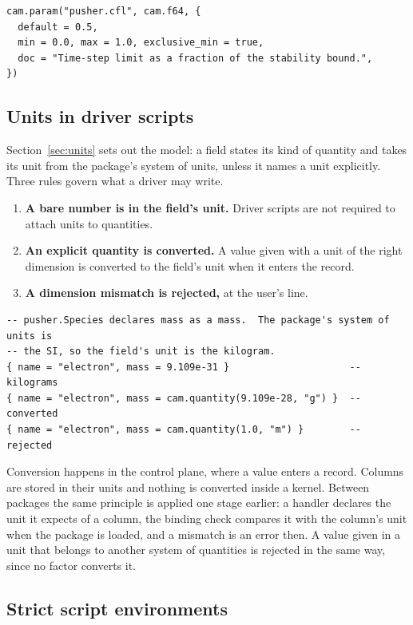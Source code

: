 \documentclass[11pt,a4paper]{article}
\begin{document}
\begin{lstlisting}[language={[5.3]Lua}]
cam.param("pusher.cfl", cam.f64, {
  default = 0.5,
  min = 0.0, max = 1.0, exclusive_min = true,
  doc = "Time-step limit as a fraction of the stability bound.",
})
\end{lstlisting}

\subsection{Units in driver scripts}

Section~\ref{sec:units} sets out the model: a field states its kind of
quantity and takes its unit from the package's system of units, unless it
names a unit explicitly.  Three rules govern what a driver may write.

\begin{enumerate}
  \item \textbf{A bare number is in the field's unit.}  Driver scripts are
        not required to attach units to quantities.
  \item \textbf{An explicit quantity is converted.}  A value given with a
        unit of the right dimension is converted to the field's unit when
        it enters the record.
  \item \textbf{A dimension mismatch is rejected,} at the user's line.
\end{enumerate}

\begin{lstlisting}[language={[5.3]Lua}]
-- pusher.Species declares mass as a mass.  The package's system of units is
-- the SI, so the field's unit is the kilogram.
{ name = "electron", mass = 9.109e-31 }                     -- kilograms
{ name = "electron", mass = cam.quantity(9.109e-28, "g") }  -- converted
{ name = "electron", mass = cam.quantity(1.0, "m") }        -- rejected
\end{lstlisting}

Conversion happens in the control plane, where a value enters a record.
Columns are stored in their units and nothing is converted inside a kernel.
Between packages the same principle is applied one stage earlier: a handler
declares the unit it expects of a column, the binding check compares it
with the column's unit when the package is loaded, and a mismatch is an
error then.  A value given in a unit that belongs to another system of
quantities is rejected in the same way, since no factor converts it.

\subsection{Strict script environments}
\label{sec:strict}
\end{document}
